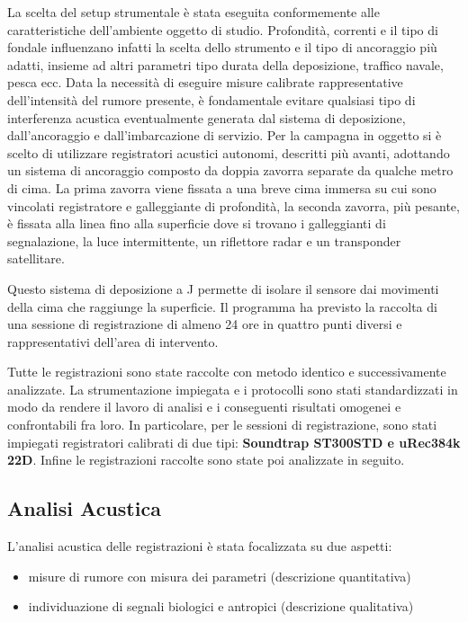 La scelta del setup strumentale è stata eseguita conformemente alle caratteristiche dell'ambiente oggetto di studio. 
Profondità, correnti e il tipo di fondale influenzano infatti la scelta dello strumento e il tipo di ancoraggio più adatti, insieme ad altri parametri tipo durata della deposizione, traffico navale, pesca ecc. 
Data la necessità di eseguire misure calibrate rappresentative dell'intensità del rumore presente, è fondamentale evitare qualsiasi tipo di interferenza acustica eventualmente generata dal sistema di deposizione, dall’ancoraggio e dall’imbarcazione di servizio. 
Per la campagna in oggetto si è scelto di utilizzare registratori acustici autonomi, descritti più avanti, adottando un sistema di ancoraggio composto da doppia zavorra separate da qualche metro di cima. 
La prima zavorra viene fissata a una breve cima immersa su cui sono vincolati registratore e galleggiante di profondità, la seconda zavorra, più pesante, è fissata alla linea fino alla superficie dove si trovano i galleggianti di segnalazione, la luce intermittente, un riflettore radar e un transponder satellitare. 

Questo sistema di deposizione a J permette di isolare il sensore dai movimenti della cima che raggiunge la superficie.
Il programma ha previsto la raccolta di una sessione di registrazione di almeno 24 ore in quattro punti diversi e rappresentativi dell’area di intervento. 

Tutte le registrazioni sono state raccolte con metodo identico e successivamente analizzate. 
La strumentazione impiegata e i protocolli sono stati standardizzati in modo da rendere il lavoro di analisi e i conseguenti risultati omogenei e confrontabili fra loro.
In particolare, per le sessioni di registrazione, sono stati impiegati registratori calibrati di due tipi: {\bfseries Soundtrap ST300STD e uRec384k 22D}.
Infine le registrazioni raccolte sono state poi analizzate in seguito. 

\subsection{Analisi Acustica}
L’analisi acustica delle registrazioni è stata focalizzata su due aspetti:

\begin{itemize}
\item misure di rumore con misura dei parametri (descrizione quantitativa) 
\item individuazione di segnali biologici e antropici (descrizione qualitativa)
\end{itemize} 

